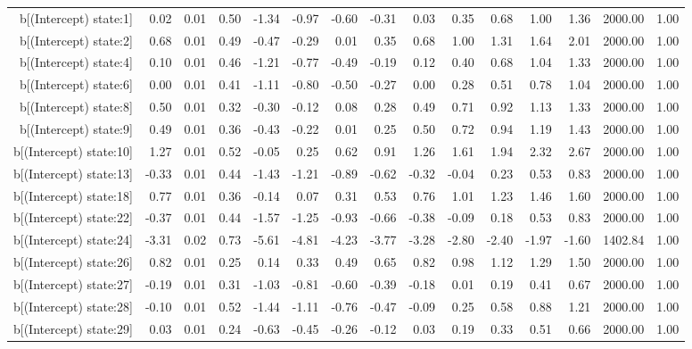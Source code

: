 \begin{table}[ht]
\begin{tabular}{rrrrrrrrrrrrrrr}
  b[(Intercept) state:1] & 0.02 & 0.01 & 0.50 & -1.34 & -0.97 & -0.60 & -0.31 & 0.03 & 0.35 & 0.68 & 1.00 & 1.36 & 2000.00 & 1.00 \\ 
  b[(Intercept) state:2] & 0.68 & 0.01 & 0.49 & -0.47 & -0.29 & 0.01 & 0.35 & 0.68 & 1.00 & 1.31 & 1.64 & 2.01 & 2000.00 & 1.00 \\ 
  b[(Intercept) state:4] & 0.10 & 0.01 & 0.46 & -1.21 & -0.77 & -0.49 & -0.19 & 0.12 & 0.40 & 0.68 & 1.04 & 1.33 & 2000.00 & 1.00 \\ 
  b[(Intercept) state:6] & 0.00 & 0.01 & 0.41 & -1.11 & -0.80 & -0.50 & -0.27 & 0.00 & 0.28 & 0.51 & 0.78 & 1.04 & 2000.00 & 1.00 \\ 
  b[(Intercept) state:8] & 0.50 & 0.01 & 0.32 & -0.30 & -0.12 & 0.08 & 0.28 & 0.49 & 0.71 & 0.92 & 1.13 & 1.33 & 2000.00 & 1.00 \\ 
  b[(Intercept) state:9] & 0.49 & 0.01 & 0.36 & -0.43 & -0.22 & 0.01 & 0.25 & 0.50 & 0.72 & 0.94 & 1.19 & 1.43 & 2000.00 & 1.00 \\ 
  b[(Intercept) state:10] & 1.27 & 0.01 & 0.52 & -0.05 & 0.25 & 0.62 & 0.91 & 1.26 & 1.61 & 1.94 & 2.32 & 2.67 & 2000.00 & 1.00 \\ 
  b[(Intercept) state:13] & -0.33 & 0.01 & 0.44 & -1.43 & -1.21 & -0.89 & -0.62 & -0.32 & -0.04 & 0.23 & 0.53 & 0.83 & 2000.00 & 1.00 \\ 
  b[(Intercept) state:18] & 0.77 & 0.01 & 0.36 & -0.14 & 0.07 & 0.31 & 0.53 & 0.76 & 1.01 & 1.23 & 1.46 & 1.60 & 2000.00 & 1.00 \\ 
  b[(Intercept) state:22] & -0.37 & 0.01 & 0.44 & -1.57 & -1.25 & -0.93 & -0.66 & -0.38 & -0.09 & 0.18 & 0.53 & 0.83 & 2000.00 & 1.00 \\ 
  b[(Intercept) state:24] & -3.31 & 0.02 & 0.73 & -5.61 & -4.81 & -4.23 & -3.77 & -3.28 & -2.80 & -2.40 & -1.97 & -1.60 & 1402.84 & 1.00 \\ 
  b[(Intercept) state:26] & 0.82 & 0.01 & 0.25 & 0.14 & 0.33 & 0.49 & 0.65 & 0.82 & 0.98 & 1.12 & 1.29 & 1.50 & 2000.00 & 1.00 \\ 
  b[(Intercept) state:27] & -0.19 & 0.01 & 0.31 & -1.03 & -0.81 & -0.60 & -0.39 & -0.18 & 0.01 & 0.19 & 0.41 & 0.67 & 2000.00 & 1.00 \\ 
  b[(Intercept) state:28] & -0.10 & 0.01 & 0.52 & -1.44 & -1.11 & -0.76 & -0.47 & -0.09 & 0.25 & 0.58 & 0.88 & 1.21 & 2000.00 & 1.00 \\ 
  b[(Intercept) state:29] & 0.03 & 0.01 & 0.24 & -0.63 & -0.45 & -0.26 & -0.12 & 0.03 & 0.19 & 0.33 & 0.51 & 0.66 & 2000.00 & 1.00 \\ 

\end{tabular}
\end{table}
